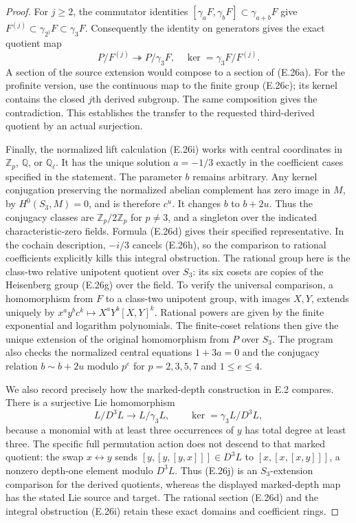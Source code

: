 \begin{proof}
For $j\ge2$, the commutator identities
$[\gamma_aF,\gamma_bF]\subset\gamma_{a+b}F$ give
$F^{(j)}\subset\gamma_{2^j}F\subset\gamma_3F$. Consequently
the identity on generators gives the exact quotient map
\[
 P/F^{(j)}\twoheadrightarrow P/\gamma_3F,
 \quad\ker=\gamma_3F/F^{(j)}.                               \tag{E.26j}
\]
A section of the source extension would compose to a section
of (E.26a). For the profinite version, use the continuous map
to the finite group (E.26c); its kernel contains the closed
$j$th derived subgroup. The same composition gives the
contradiction. This establishes the transfer to the requested
third-derived quotient by an actual surjection.

Finally, the normalized lift calculation (E.26i) works with
central coordinates in $\mathbb Z_p$, $\mathbb Q$, or
$\mathbb Q_\ell$. It has the unique solution $a=-1/3$ exactly
in the coefficient cases specified in the statement. The
parameter $b$ remains arbitrary. Any kernel conjugation
preserving the normalized abelian complement has zero image
in $M$, by $H^0(S_3,M)=0$, and is therefore $c^u$.
It changes $b$ to $b+2u$. Thus the conjugacy classes are
$\mathbb Z_p/2\mathbb Z_p$ for $p\ne3$, and a singleton
over the indicated characteristic-zero fields. Formula
(E.26d) gives their specified representative. In the
cochain description, $-i/3$ cancels (E.26h), so the comparison
to rational coefficients explicitly kills this integral
obstruction.
The rational group here is the class-two relative unipotent
quotient over $S_3$: its six cosets are copies of the
Heisenberg group (E.26g) over the field. To verify the universal
comparison, a homomorphism from $F$ to a class-two unipotent
group, with images $X,Y$, extends uniquely by
$x^a y^b c^k\mapsto X^aY^b[X,Y]^k$. Rational powers are given
by the finite exponential and logarithm polynomials.
The finite-coset relations then give the unique extension
of the original homomorphism from $P$ over $S_3$.
The program also checks the normalized central equations
$1+3a=0$ and the conjugacy relation $b\sim b+2u$ modulo
$p^e$ for $p=2,3,5,7$ and $1\le e\le4$.

We also record precisely how the marked-depth construction
in E.2 compares. There is a surjective Lie homomorphism
\[
 L/D^3L\longrightarrow L/\gamma_3L,
 \qquad \ker=\gamma_3L/D^3L,
\]
because a monomial with at least three occurrences of $y$
has total degree at least three. The specific full
permutation action does not descend to that marked quotient:
the swap $x\leftrightarrow y$ sends
$[y,[y,[y,x]]]\in D^3L$ to
$[x,[x,[x,y]]]$, a nonzero depth-one element modulo $D^3L$.
Thus (E.26j) is an $S_3$-extension comparison for the derived
quotients, whereas the displayed marked-depth map has the
stated Lie source and target. The rational section (E.26d)
and the integral obstruction (E.26i) retain these exact
domains and coefficient rings.
\end{proof}
